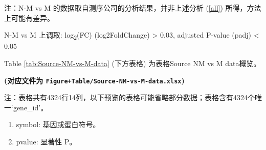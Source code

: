 \documentclass[
]{article}
\providecommand{\tightlist}{%
  \setlength{\itemsep}{0pt}\setlength{\parskip}{0pt}}
\begin{document}
注：N-M vs M 的数据取自测序公司的分析结果，并非上述分析 (\ref{all}) 所得，方法上可能有差异。

N-M vs M 上调取: \textbar log\textsubscript{2}(FC)\textbar{} (log2FoldChange) \textgreater{} 0.03, adjusted P-value (padj) \textless{} 0.05

Table \ref{tab:Source-NM-vs-M-data} (下方表格) 为表格Source NM vs M data概览。

\textbf{(对应文件为 \texttt{Figure+Table/Source-NM-vs-M-data.xlsx})}

\begin{center}\begin{tcolorbox}[colback=gray!10, colframe=gray!50, width=0.9\linewidth, arc=1mm, boxrule=0.5pt]注：表格共有4324行14列，以下预览的表格可能省略部分数据；表格含有4324个唯一`gene\_id'。
\end{tcolorbox}
\end{center}
\begin{center}\begin{tcolorbox}[colback=gray!10, colframe=gray!50, width=0.9\linewidth, arc=1mm, boxrule=0.5pt]\begin{enumerate}\tightlist
\item symbol: 基因或蛋白符号。
\item pvalue: 显著性 P。
\end{enumerate}\end{tcolorbox}
\end{center}
\end{document}

